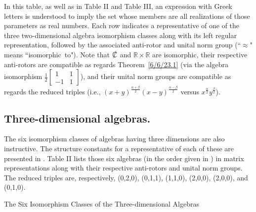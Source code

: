 \documentclass{amsart}
\theoremstyle{definition}
\numberwithin{theorem}{section}
\numberwithin{equation}{section}
\begin{document}
\bigskip


 {\small In this table, as well as in Table II and Table III, an expression with Greek letters is understood to imply the set whose members are all realizations of those parameters as real numbers.  Each row indicates a representative  of one of the three two-dimensional algebra isomorphism classes along with its left regular representation, followed by the associated anti-rotor and unital norm group (``$\approx$" means \mbox{``isomorphic to"}). Note that  $\slashed{\mathbb{C}}$ and $\mathbb{R}\times\mathbb{R}$ are isomorphic, their respective anti-rotors are compatible as regards \mbox{Theorem \ref{6/6/23.1}} (via the algebra isomorphism $\frac{1}{2}\left[\begin{array}{ccc}
 1 & 1   \\ 
 -1 & 1    
\end{array}\right]$), and their unital norm groups are  compatible as regards the reduced triples (i.e., $(x+y)^{\frac{\alpha+\beta}{2}}(x-y)^{\frac{\alpha-\beta}{2}}$ versus $x^\frac{\alpha}{2} y^\frac{\beta}{2}$).}

\vspace{1.75cm} 

\subsection{Three-dimensional algebras.} The six isomorphism classes of  algebras having three dimensions are also instructive.  The structure constants for a representative of each of these are presented in \cite{kobayashi:2021}.  Table II lists those six algebras (in the order given in \cite{kobayashi:2021}) in matrix representations along with their respective anti-rotors and unital norm groups. The  reduced triples are, respectively, (0,2,0), (0,1,1), (1,1,0), (2,0,0), (2,0,0), and (0,1,0).



\hspace{0pt}
\vfill
\pagebreak
\vfill
\hspace{0pt}

  \centerline{\large The Six Isomorphism Classes of the Three-dimensional Algebras }

\vspace{.5cm}
\end{document}
